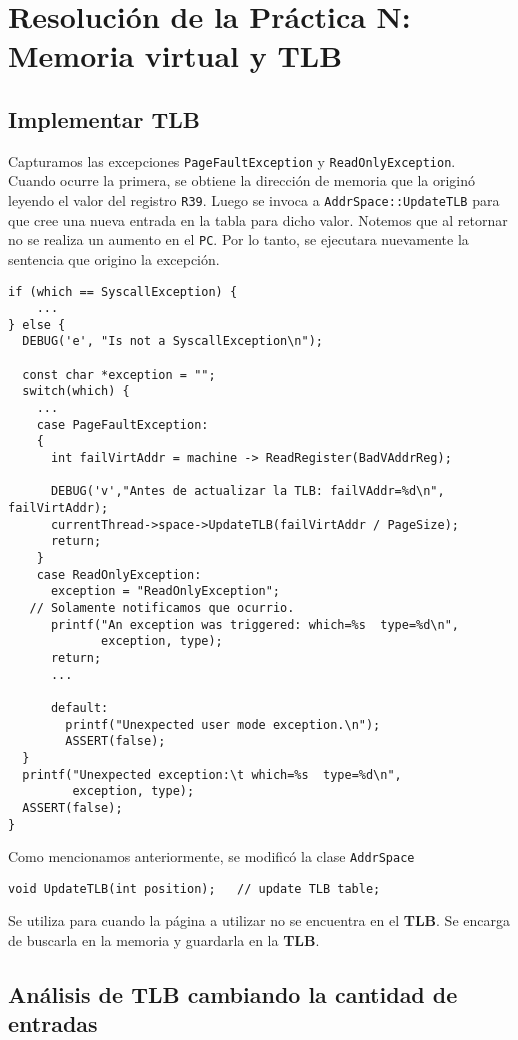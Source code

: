 \chapter{Resolución de la Práctica N: Memoria virtual y TLB}
\section{Implementar TLB} \label{update_TLB}
Capturamos las excepciones \texttt{PageFaultException} y \texttt{ReadOnlyException}.\\
Cuando ocurre la primera, se obtiene la dirección de memoria que la originó leyendo el valor del registro \texttt{R39}. Luego se invoca a \texttt{AddrSpace::UpdateTLB} para que cree una nueva entrada en la tabla para dicho valor. Notemos que al retornar no se realiza un aumento en el \texttt{PC}. Por lo tanto, se ejecutara nuevamente la sentencia que origino la excepción.
\begin{lstlisting}[style=C]
if (which == SyscallException) {
	...
} else {
  DEBUG('e', "Is not a SyscallException\n");
  
  const char *exception = "";
  switch(which) {
    ...
    case PageFaultException:
    {
      int failVirtAddr = machine -> ReadRegister(BadVAddrReg);

      DEBUG('v',"Antes de actualizar la TLB: failVAddr=%d\n", failVirtAddr);
      currentThread->space->UpdateTLB(failVirtAddr / PageSize);
      return;
    }
    case ReadOnlyException: 
      exception = "ReadOnlyException";
   // Solamente notificamos que ocurrio.
      printf("An exception was triggered: which=%s  type=%d\n",
             exception, type);
      return;    
      ...
    	
      default:
        printf("Unexpected user mode exception.\n");
        ASSERT(false);
  }
  printf("Unexpected exception:\t which=%s  type=%d\n",
         exception, type);
  ASSERT(false);
}
\end{lstlisting}
Como mencionamos anteriormente, se modificó la clase \texttt{AddrSpace}
\begin{lstlisting}[style=C]
void UpdateTLB(int position);   // update TLB table;
\end{lstlisting}
Se utiliza para cuando la página a utilizar no se encuentra en el \textbf{TLB}. Se encarga de buscarla en la memoria y guardarla en la \textbf{TLB}.
\section{Análisis de TLB cambiando la cantidad de entradas}
